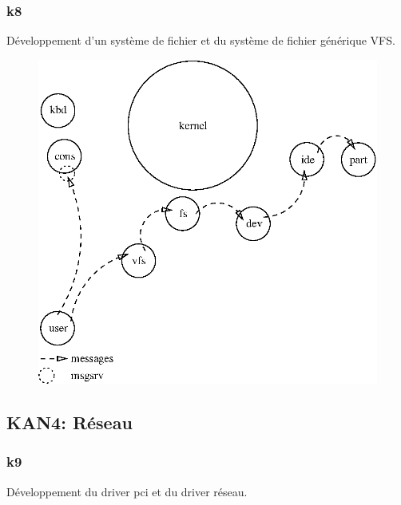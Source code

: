 \documentclass[10pt,a4wide]{article}
\begin{document}
\newpage

\subsubsection{k8}

D\'eveloppement d'un syst\`eme de fichier et du syst\`eme de fichier
g\'en\'erique VFS.

\vspace{5cm}

\begin{figure}[h]
\centerline{\includegraphics{figures/k8.eps}}
\end{figure}

\newpage

\subsection{KAN4: R\'eseau}

\subsubsection{k9}

D\'eveloppement du driver pci et du driver r\'eseau.

\vspace{5cm}
\end{document}
